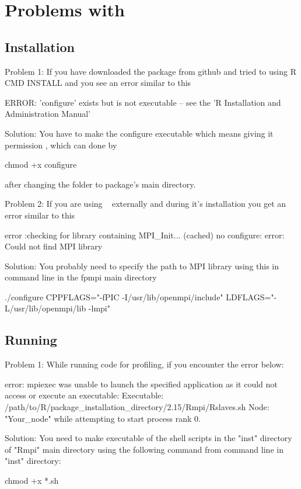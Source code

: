 \section{Problems with }
\label{sec:debug}


\subsection{Installation}

{\color{red}Problem 1:}  If you have downloaded the package from github and 
tried to using R CMD INSTALL  and you see an error similar to this
\begin{Output}
ERROR: 'configure' exists but is not executable -- see the 'R Installation and Administration Manual'
\end{Output}
{\color{dkgreen}Solution:}  You have to make the configure executable which 
means giving it permission , which can done by
\begin{Code}
chmod +x configure
\end{Code}
after changing the folder to package's main directory.

{\color{red}Problem 2:}  If you are using ~\citep{fpmpi} externally 
and during it's installation you get an error similar to this
\begin{Output}
error :checking for library containing MPI_Init... (cached) no configure: 
error: Could not find MPI library
\end{Output}
{\color{dkgreen}Solution:} You probably need to specify the path to MPI library using this in command line in the fpmpi main directory
\begin{Code}
./configure CPPFLAGS="-fPIC -I/usr/lib/openmpi/include" LDFLAGS="-L/usr/lib/openmpi/lib -lmpi"
\end{Code}



\subsection{Running}

{\color{red}Problem 1:}  While running  code for profiling, if you
encounter the error below:
\begin{Output}
error: mpiexec was unable to launch the specified application as it could not access
or execute an executable:
Executable: /path/to/R/package_installation_directory/2.15/Rmpi/Rslaves.sh
Node: "Your_node"
while attempting to start process rank 0.
\end{Output}
{\color{dkgreen}Solution:}  You need to make executable of the shell scripts in 
the "inst" directory of "Rmpi" main directory using the following command from 
command line in "inst" directory:
\begin{Code}
chmod +x *.sh
\end{Code}



